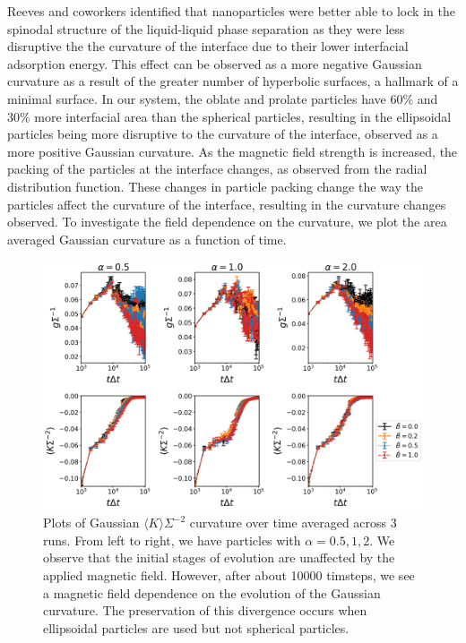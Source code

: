 Reeves and coworkers identified that nanoparticles were better able to
lock in the spinodal structure of the liquid-liquid phase separation as
they were less disruptive the the curvature of the interface due to
their lower interfacial adsorption energy. This effect can be observed
as a more negative Gaussian curvature as a result of the greater number
of hyperbolic surfaces, a hallmark of a minimal surface. In our system,
the oblate and prolate particles have 60\% and 30\% more interfacial
area than the spherical particles, resulting in the ellipsoidal
particles being more disruptive to the curvature of the interface,
observed as a more positive Gaussian curvature. As the magnetic field
strength is increased, the packing of the particles at the interface
changes, as observed from the radial distribution function.
\cite{karthikeyan_formation_2024} These changes in particle packing
change the way the particles affect the curvature of the interface,
resulting in the curvature changes observed. To investigate the field
dependence on the curvature, we plot the area averaged Gaussian
curvature as a function of time.

\begin{figure} 
    \centering 
    \includegraphics[width=\textwidth]{figures/results/paper1/genus_curvature_vs_coverage.png} 
    \caption{Plots of Gaussian $\langle K \rangle \Sigma^{-2}$ curvature over time averaged across 3 runs. 
    From left to right, we have particles with $\alpha = 0.5, 1, 2$. We observe that the initial stages of 
    evolution are unaffected by the applied magnetic field. However, after about 10000 timsteps, we see a 
    magnetic field dependence on the evolution of the Gaussian curvature. The preservation of this divergence 
    occurs when ellipsoidal particles are used but not spherical particles.} 
    \label{fig:curvature_vs_coverage}
\end{figure}

